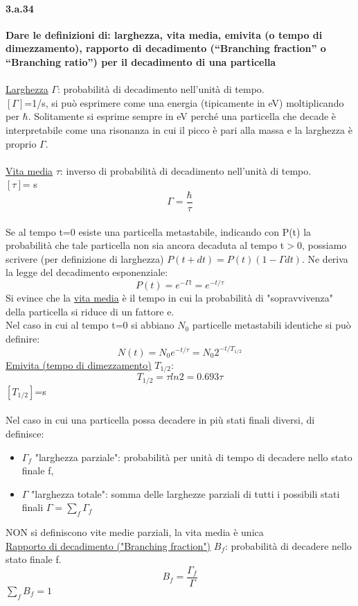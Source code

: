 \documentclass[twoside]{article}
\begin{document}
\paragraph{3.a.34}\textbf{Dare le definizioni di: larghezza, vita media, emivita (o tempo di dimezzamento), rapporto di decadimento (“Branching fraction” o “Branching ratio”) per il decadimento di una particella}\\
\\
\underline{Larghezza} $\Gamma$: probabilità di decadimento nell'unità di tempo.\\
$[\Gamma]$=1/s, si può esprimere come una energia (tipicamente in eV) moltiplicando per $\hbar$. Solitamente si esprime sempre in eV perché una particella che decade è interpretabile come una risonanza in cui il picco è pari alla massa e la larghezza è proprio $\Gamma$.\\
\\
\underline{Vita media} $\tau$: inverso di probabilità di decadimento nell'unità di tempo.\\
$[\tau]$= s\\
\begin{equation}
\Gamma=\frac{\hbar}{\tau} 
\end{equation}
\\
Se al tempo t=0 esiste una particella metastabile, indicando con P(t) la probabilità che tale particella non sia ancora decaduta al tempo t$>$0, possiamo scrivere (per definizione di larghezza) $P(t+dt)=P(t)(1-\Gamma dt)$. Ne deriva la legge del decadimento esponenziale:
\begin{equation}
    P(t)=e^{-\Gamma t}= e^{-t/\tau}
\end{equation}
Si evince che la \underline{vita media} è il tempo in cui la probabilità di "sopravvivenza" della particella si riduce di un fattore e.\\
Nel caso in cui al tempo t=0 si abbiano $N_0$ particelle metastabili identiche si può definire:
\begin{equation}
    N(t)=N_0 e^{-t/\tau} =N_0 2^{-t/T_{1/2}}
\end{equation}
\underline{Emivita (tempo di dimezzamento)} $T_{1/2}$:
\begin{equation}
    T_{1/2}=\tau ln2= 0.693 \tau
\end{equation}
$[T_{1/2}]$=s\\
\\
Nel caso in cui una particella possa decadere in più stati finali diversi, di definisce:
\begin{itemize}
    \item $\Gamma_f$ "larghezza parziale": probabilità per unità di tempo di decadere nello stato finale f,
    \item $\Gamma$ "larghezza totale": somma delle larghezze parziali di tutti i possibili stati finali $\Gamma=\sum_f \Gamma_f $
\end{itemize}
\warning NON si definiscono vite medie parziali, la vita media è unica\\
\underline{Rapporto di decadimento ("Branching fraction")} $B_f$: probabilità di decadere nello stato finale f.
\begin{equation}
    B_f=\frac{\Gamma_f}{\Gamma}
\end{equation}
\warning  $\sum_f B_f=1$
\end{document}
